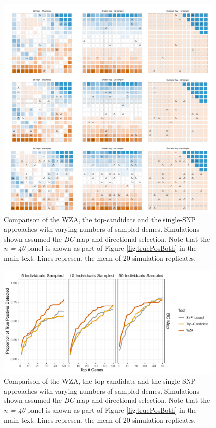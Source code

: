 \documentclass[10pt,twoside,lineno, twocolumn]{GSA_format}
\begin{document}
\pagebreak

\begin{figure}[H]
  \includegraphics[width = \textwidth,keepaspectratio]{Plots/sample_maps.pdf}
  \caption{Comparison of the WZA, the top-candidate and the single-SNP approaches with varying numbers of sampled demes. Simulations shown assumed the \textit{BC} map and directional selection. Note that the \textit{n = 40} panel is shown as part of Figure \ref{fig:truePosBoth} in the main text. Lines represent the mean of 20 simulation replicates.}

  \label{fig:sampleMaps}
\end{figure}

\pagebreak

\begin{figure}[H]
  \includegraphics[width = \textwidth,keepaspectratio]{Plots/SampleSizeComparison_individuals.pdf}
  \caption{Comparison of the WZA, the top-candidate and the single-SNP approaches with varying numbers of sampled demes. Simulations shown assumed the \textit{BC} map and directional selection. Note that the \textit{n = 40} panel is shown as part of Figure \ref{fig:truePosBoth} in the main text. Lines represent the mean of 20 simulation replicates.}

  \label{fig:sampleSize_individuals}
\end{figure}
\end{document}
